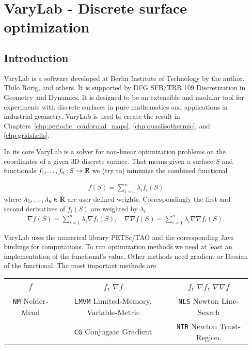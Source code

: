 \documentclass[Thesis.tex]{subfiles}
\begin{document}
\chapter{{\sc VaryLab} - Discrete surface optimization}
\label{chp:varylab}

\section{Introduction}

{\sc VaryLab} is a software developed at Berlin Institute of Technology by the author, Thilo R\"orig, and others. It is supported by DFG SFB/TRR 109 Discretization in Geometry and Dynamics. It is designed to be an extensible and modular tool for experiments with discrete surfaces in pure mathematics and applications in industrial geometry. {\sc VaryLab} is used to create the result in Chapters~\ref{chp:periodic_conformal_maps}, \ref{chp:quasiisothermic}, and \ref{chp:gridshells}.

In its core {\sc VaryLab} is a solver for non-linear optimization problems on the coordinates of a given 3D discrete surface. That means given a surface $S$ and functionals $f_1,\ldots,f_n:S\to\mathbb R$ we (try to) minimize the combined functional

\begin{eqnarray*}
	f(S) = \sum_{i=1}^n \lambda_i f_i(S)
\end{eqnarray*}
where $\lambda_1,\ldots,\lambda_n\in \mathbb R$ are user defined weights. Correspondingly the first and second  derivatives of $f_i(S)$ are weighted by $\lambda_i$
\begin{eqnarray*}
	\nabla f(S) = \sum_{i=1}^n \lambda_i \nabla f_i(S), \quad \nabla\nabla f(S) = \sum_{i=1}^n \lambda_i \nabla\nabla f_i(S).
\end{eqnarray*}

{\sc VaryLab} uses the numerical library {\sc PETSc}/{\sc TAO} \cite{petsc-user-ref, petsc-web-page, tao-user-ref} and the corresponding {\sc Java} bindings \cite{jpetsctao-web-page} for computations. To run optimization methods we need at least an implementation of the functional's value. Other methods need gradient or Hessian of the functional. The most important methods are
 
\begin{tabular}{c | c | c}
	$f$ & $f$, $\nabla f$ & $f$, $\nabla f$, $\nabla\nabla f$\\ \hline
	{\tt NM} Nelder-Mead & {\tt LMVM} Limited-Memory, Variable-Metric & {\tt NLS} Newton Line-Search \\
	& {\tt CG} Conjugate Gradient & {\tt NTR} Newton Trust-Region.
\end{tabular}
\end{document}
